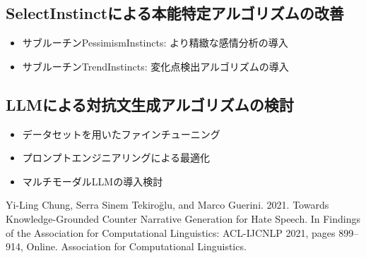 \documentclass[dvipdfmx]{jsarticle}
\begin{document}
\subsection{SelectInstinctによる本能特定アルゴリズムの改善}

\begin{itemize}
  \item サブルーチンPessimismInstincts: より精緻な感情分析の導入
  \item サブルーチンTrendInstincts: 変化点検出アルゴリズムの導入
\end{itemize}

\vspace{0.5em}

\subsection{LLMによる対抗文生成アルゴリズムの検討}

\begin{itemize}
  \item データセットを用いたファインチューニング
  \item プロンプトエンジニアリングによる最適化
  \item マルチモーダルLLMの導入検討
\end{itemize}

\vspace{1em}

\begin{thebibliography}{99}
  Yi-Ling Chung, Serra Sinem Tekiroğlu, and Marco Guerini. 2021. Towards Knowledge-Grounded Counter Narrative Generation for Hate Speech. In Findings of the Association for Computational Linguistics: ACL-IJCNLP 2021, pages 899–914, Online. Association for Computational Linguistics.

\end{thebibliography}
\end{document}
